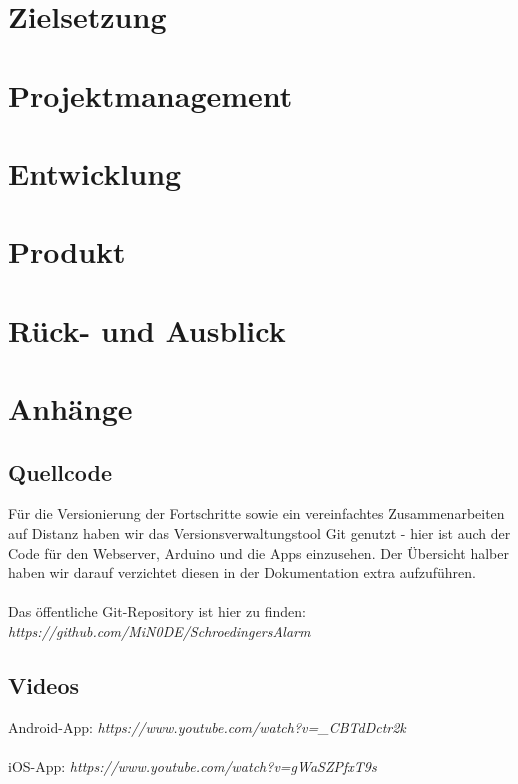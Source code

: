 \documentclass[11pt,a4paper,ngerman]{report}
\begin{document}
	
	
	\chapter{Zielsetzung}
	
	\clearpage
	
	\chapter{Projektmanagement}
		
		
	\chapter{Entwicklung}
	
		
			
		
    \chapter{Produkt}
	
	\chapter{Rück- und Ausblick}
	
	
	\chapter{Anhänge}
	\section{Quellcode}
	Für die Versionierung der Fortschritte sowie ein vereinfachtes Zusammenarbeiten auf Distanz haben wir das Versionsverwaltungstool Git genutzt - hier ist auch der Code für den Webserver, Arduino und die Apps einzusehen. Der Übersicht halber haben wir darauf verzichtet diesen in der Dokumentation extra aufzuführen. 
	\\
	\\
	Das öffentliche Git-Repository ist hier zu finden:
	\\ \textit{https://github.com/MiN0DE/SchroedingersAlarm}
	\section{Videos}
	Android-App: \textit{https://www.youtube.com/watch?v=\_CBTdDctr2k}
	\\
	\\
	iOS-App: \textit{https://www.youtube.com/watch?v=gWaSZPfxT9s} 

	
	
	\listoffigures
	\printbibliography[heading=bibintoc, title={Quellenverzeichnis}]
\end{document}
